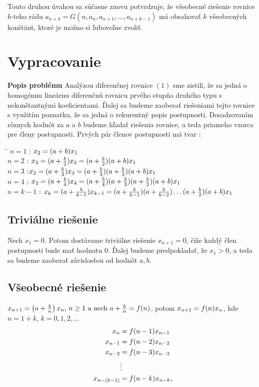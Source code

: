 \documentclass[a4paper,10pt]{article}
\theoremstyle{plain}
\theoremstyle{definition}
\begin{document}
Touto druhou úvahou sa súčasne znovu potvrdzuje, že všeobecné riešenie rovnice $k$-teho rádu 
$a_{n+k} = G(n, a_{n}, a_{n+1}, \ldots, a_{n+k-1})$ má obsahovať
$k$ všeobecných konštánt, ktoré je možno si ľubovoľne zvoliť.

\newpage
\section{Vypracovanie}
\textbf{Popis problému}\newline
Analýzou diferenčnej rovnice $ (1) $ sme zistili, že sa jedná o homogénnu lineárnu diferenčnú rovnicu prvého stupňa druhého typu s nekonštantnými koeficientami. Ďalej sa budeme zaoberať riešeniami tejto rovnice s využitím poznatku, že sa jedná o rekurentný popis postupnosti. Dosadzovaním rôznych hodnôt za $ a $ a $ b $ budeme hľadať riešenia rovnice, a teda priameho vzorca pre členy postupnosti. \newline\newline
Prvých pár členov postupnosti má tvar : 
\begin{spacing}{1.4}
\begin{tabbing}
\hspace{2cm}\=\kill
 $n=1$ :\> $x_{2}= (a+b)\*x_{1}$\\ 
 $n=2$ :\>  $x_{3}=(a+\frac{b}{2})\*x_{2}=(a+\frac{b}{2})(a+b)\*x_{1}$ \\ 
 $n=3$ :\>$x_{2}=(a+\frac{b}{3})\*x_{3}=(a+\frac{b}{3})\*(a+\frac{b}{2})(a+b)\*x_{1}$\\
 $n=4$ :\> $x_{2}=(a+\frac{b}{4})\*x_{4}=(a+\frac{b}{4})\*(a+\frac{b}{3})\*(a+\frac{b}{2})
 (a+b)\*x_{1}$\\ 
  $n=k-1$ :\> $x_{k}=(a+\frac{b}{k-1})\*x_{k-1}=(a+\frac{b}{k-1})\*(a+\frac{b}{k-2})\ldots(a+\frac{b}{2})\*(a+b)\*x_{1}$
\end{tabbing} 
\end{spacing}
 

\subsection{Triviálne riešenie}
Nech $x_{1}=0$.\newline
 Potom dostávame triviálne riešenie $x_{n+1} = 0$, číže každý člen postupnosti bude mať hodnotu $0$. Ďalej budeme predpokladať, že $ x_{1} > 0 $, a teda sa budeme 
zaoberať závislosťou od hodnôt $ a,b $.

\subsection{Všeobecné riešenie}
$x_{n+1}=\left(a+{\frac{b}{n}}\right)\*x_{n} \text{, } n \geq 1 \text{ a nech } a + {\frac{b}{n}} = f(n)$, potom
$x_{n+1}=f(n)\*x_{n}   $, kde $ n = 1 + k $, $ k = 0,1,2,... $
\begin{align*}
x_{n}&=f(n-1)\*x_{n-1}    \\
x_{n-1}&=f(n-2)\*x_{n-2}    \\
x_{n-2}&=f(n-3)\*x_{n-3}    \\
&\vdots \\
x_{n-(k-1)}&=f(n-k)\*x_{n-k}\text{,}    
\end{align*}
\end{document}
